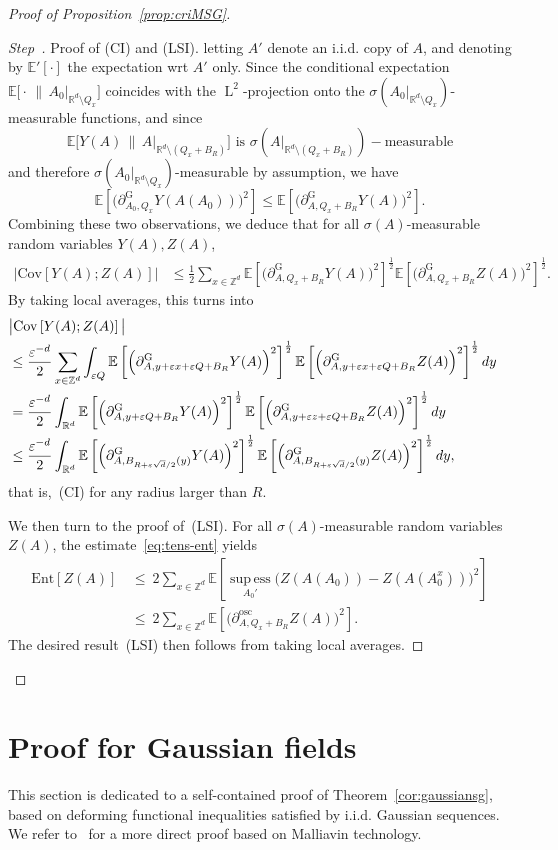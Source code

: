 \documentclass[11pt]{article}
\theoremstyle{definition}
\numberwithin{equation}{section}
\numberwithin{figure}{section}
\numberwithin{table}{section}
\newcommand{\R}{\mathbb R}
\newcommand{\Z}{\mathbb Z}
\newcommand{\expec}[1]{\mathbb{E}\left[#1 \right]}
\newcommand{\expecp}[1]{\mathbb{E}'\left[#1 \right]}
\newcommand{\expeCm}[2]{\mathbb{E}\big[#1 \,\big\|\,#2\big]}
\newcommand{\e}{\varepsilon}
\DeclareMathOperator{\supess}{sup\,ess}
\DeclareMathOperator{\Ld}{L}
\newcommand{\supessd}[1]{\mathrel{\mathop{\supess}\limits_{#1}}}
\newcommand{\parG}[1]{\partial_{#1}^{\operatorname{G}}}
\newcommand{\osc}{\partial^{\mathrm{osc}}}
\newcommand{\oscd}[1]{\mathrel{\osc_{#1}}}
\newcommand{\ent}[1]{\mathrm{Ent}\!\left[#1\right]}
\newcommand{\cov}[2]{\mathrm{Cov}\left[#1;#2\right]}
\newcounter{stepcount}
\newenvironment{step}{\refstepcounter{stepcount}\begin{proof}[Step~\thestepcount]}{\let\qed\relax\end{proof}}
\begin{document}
\begin{proof}[Proof of Proposition~\ref{prop:criMSG}]
\begin{step}{Proof of (CI) and (LSI).}
letting $A'$ denote an i.i.d. copy of $A$, and denoting by $\expecp{\cdot}$ the expectation wrt $A'$ only. Since the conditional expectation $\expeCm{\cdot}{A_0|_{\R^d\setminus Q_x}}$ coincides with the $\Ld^2$-projection onto the $\sigma(A_0|_{\R^d\setminus Q_x})$-measurable functions, and since
\[
\expeCm{Y(A)}{A|_{\R^d\setminus (Q_x+B_R)}} \text{ is }\sigma\left(A|_{\R^d\setminus(Q_x+B_R)}\right)-\text{measurable}
\]
and therefore $\sigma(A_0|_{\R^d\setminus Q_x})$-measurable by assumption, we have
\[
\expec{\Big(\parG{A_0,Q_x}Y(A(A_0))\Big)^2}\le\expec{\Big(\parG{A,Q_x+B_R}Y(A)\Big)^2}.
\]
Combining these two observations, we deduce that for all $\sigma(A)$-measurable random variables $Y(A),Z(A)$,
\begin{align*}
\big|\cov{Y(A)}{Z(A)}\big|&\le\frac12\sum_{x\in\Z^d}\expec{\Big(\parG{A,Q_x+B_R}Y(A)\Big)^2}^\frac12\expec{\Big(\parG{A,Q_x+B_R}Z(A)\Big)^2}^\frac12.
\end{align*}
By taking local averages, this turns into
\begin{align*}
\lefteqn{\big|\cov{Y(A)}{Z(A)}\big|}
\\
&\le\frac{\e^{-d}}2\sum_{x\in\Z^d}\int_{\e Q}\expec{\Big(\parG{A,y+\e x+\e Q+B_R}Y(A)\Big)^2}^\frac12\expec{\Big(\parG{A,y+\e x+\e Q+B_R}Z(A)\Big)^2}^\frac12dy\\
&=\frac{\e^{-d}}2\int_{\R^d}\expec{\Big(\parG{A,y+\e Q+B_R}Y(A)\Big)^2}^\frac12\expec{\Big(\parG{A,y+\e z+\e Q+B_R}Z(A)\Big)^2}^\frac12dy\\
&\le\frac{\e^{-d}}2\int_{\R^d}\expec{\Big(\parG{A,B_{R+\e\sqrt d/2}(y)}Y(A)\Big)^2}^\frac12\expec{\Big(\parG{A,B_{R+\e\sqrt d/2}(y)}Z(A)\Big)^2}^\frac12dy,
\end{align*}
that is,~(CI) for any radius larger than $R$.

\noindent We then turn to the proof of~(LSI). For all $\sigma(A)$-measurable random variables $Z(A)$, the estimate~\eqref{eq:tens-ent} yields
\begin{align*}
\ent{Z(A)}\,&\le~2\sum_{x\in\Z^d}\expec{\supessd{A_0'}\big(Z(A(A_0))-Z(A(A_0^{x}))\big)^2}
\\
&\le~2\sum_{x\in\Z^d}\expec{\Big(\oscd{A,Q_x+B_R}Z(A)\Big)^2}.
\end{align*}
The desired result~(LSI) then follows from taking local averages.
\end{step}
\end{proof}


\section{Proof for Gaussian fields}\label{chap:condunif}
This section is dedicated to a self-contained proof of Theorem~\ref{cor:gaussiansg}, based on deforming functional inequalities satisfied by i.i.d. Gaussian sequences. We refer to~\cite[Appendix~A]{DG3} for a more direct proof based on Malliavin technology.
\end{document}
